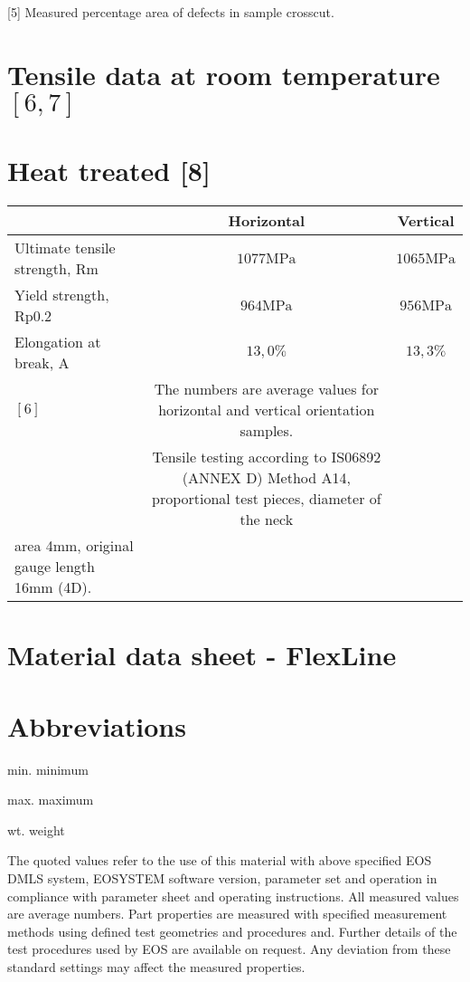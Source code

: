 \documentclass[10pt]{article}
\begin{document}
[5] Measured percentage area of defects in sample crosscut.

\section*{Tensile data at room temperature $[6,7]$}
\section*{Heat treated [8]}
\begin{center}
\begin{tabular}{lcc}
\hline
 & Horizontal & Vertical \\
\hline
Ultimate tensile strength, Rm & $1077 \mathrm{MPa}$ & $1065 \mathrm{MPa}$ \\
\hline
Yield strength, Rp0.2 & $964 \mathrm{MPa}$ & $956 \mathrm{MPa}$ \\
\hline
Elongation at break, A & $13,0 \%$ & $13,3 \%$ \\
$[6]$ & The numbers are average values for horizontal and vertical orientation samples. &  \\
[7]
 & Tensile testing according to IS06892 (ANNEX D) Method A14, proportional test pieces, diameter of the neck &  \\
area 4mm, original gauge length 16mm (4D). &  &  \\
\end{tabular}
\end{center}

\section*{Material data sheet - FlexLine}
\section*{Abbreviations}
min. minimum

max. maximum

wt. weight

The quoted values refer to the use of this material with above specified EOS DMLS system, EOSYSTEM software version, parameter set and operation in compliance with parameter sheet and operating instructions. All measured values are average numbers. Part properties are measured with specified measurement methods using defined test geometries and procedures and. Further details of the test procedures used by EOS are available on request. Any deviation from these standard settings may affect the measured properties.
\end{document}
